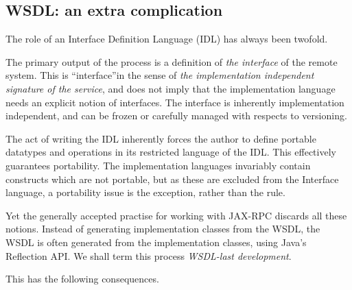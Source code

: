 \subsection{WSDL: an extra complication}
\label{objections:wsdl-gen}

The role of an Interface Definition Language (IDL) has always been
twofold.

The primary output of the process is a definition of \emph{the
interface} of the remote system. This is ``interface''in the sense of
\emph{the implementation independent signature of the service}, and does
not imply that the implementation language needs an explicit notion of
interfaces. The interface is inherently implementation independent,
and can be frozen or carefully managed with respects to versioning.

The act of writing the IDL inherently forces the author to define
portable datatypes and operations in its restricted language of the
IDL.  This effectively guarantees portability. The implementation
languages invariably contain constructs which are not portable, but as
these are excluded from the Interface language, a portability issue is
the exception, rather than the rule.

Yet the generally accepted practise for working with JAX-RPC discards
all these notions. Instead of generating implementation classes from
the WSDL, the WSDL is often generated from the implementation classes,
using Java's Reflection API. We shall term this process
\emph{WSDL-last development}.

This has the following consequences.

